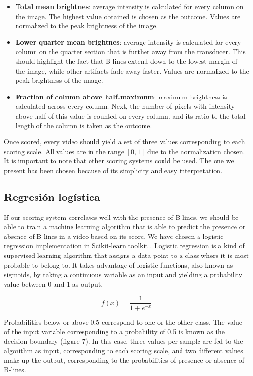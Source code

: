 \documentclass[11pt]{article} %
\begin{document}
\begin{itemize}
	\item \textbf{Total mean brightnes}: average intensity is calculated for every column on the image. The highest value obtained is chosen as the outcome. Values are normalized to the peak brightness of the image.
	\item \textbf{Lower quarter mean brightnes}: average intensity is calculated for every column on the quarter section that is further away from the transducer. This should highlight the fact that B-lines extend down to the lowest margin of the image, while other artifacts fade away faster. Values are normalized to the peak brightness of the image.
	\item \textbf{Fraction of column above half-maximum}: maximum brightness is calculated across every column. Next, the number of pixels with intensity above half of this value is counted on every column, and its ratio to the total length of the column is taken as the outcome. 
\end{itemize}

Once scored, every video should yield a set of three values corresponding to each scoring scale. All values are in the range $[0,1]$ due to the normalization chosen. It is important to note that other scoring systems could be used. The one we present has been chosen because of its simplicity and easy interpretation.

\subsection{Regresión logística}

	If our scoring system correlates well with the presence of B-lines, we should be able to train a machine learning algorithm that is able to predict the presence or absence of B-lines in a video based on its score. We have chosen a logistic regression implementation in Scikit-learn toolkit \cite{sklearn}. Logistic regression is a kind of supervised learning algorithm that assigns a data point to a class where it is most probable to belong to. It takes advantage of logistic functions, also known as sigmoids, by taking a continuous variable as an input and yielding a probability value between 0 and 1 as output. 

	\[ f(x) = \frac{1}{1+ e^{-x}} \]
	
	Probabilities below or above 0.5 correspond to one or the other class. The value of the input variable corresponding to a probability of 0.5 is known as the decision boundary (figure 7). In this case, three values per sample are fed to the algorithm as input, corresponding to each scoring scale, and two different values make up the output, corresponding to the probabilities of presence or absence of B-lines.
	
\end{document}
